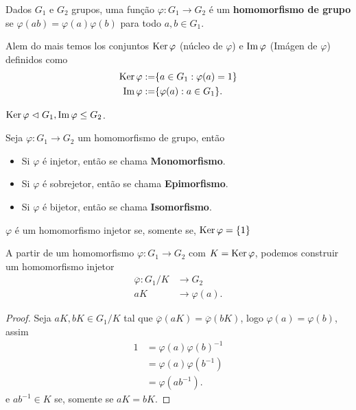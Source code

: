 \begin{definition}
  Dados $G_1$ e $G_2$ grupos, uma função $\varphi:G_1\to G_2$ é um \textbf{homomorfismo de grupo} se $\varphi(ab)=\varphi(a)\varphi(b)$ para todo $a,b\in G_1$.

  Alem do mais temos los conjuntos $\operatorname{Ker} \varphi$ (núcleo de $\varphi$) e $\operatorname{Im}\varphi$ (Imágen de $\varphi$) definidos como
  \begin{align*}
    \operatorname{Ker}\varphi:=&\{a\in G_1:\varphi(a)=1\}\\
    \operatorname{Im}\varphi:=&\{\varphi(a):a\in G_1\}.
  \end{align*}
\end{definition}
\begin{note}
  $\operatorname{Ker}\varphi \vartriangleleft G_1,\operatorname{Im}\varphi\leq G_2$.
\end{note}
\begin{definition}
  Seja $\varphi:G_1\to G_2$ um homomorfismo de grupo, então
  \begin{itemize}
    \item Si $\varphi$ é injetor, então se chama \textbf{Monomorfismo}.
    \item Si $\varphi$ é sobrejetor, então se chama \textbf{Epimorfismo}.
    \item Si $\varphi$ é bijetor, então se chama \textbf{Isomorfismo}. 
  \end{itemize}
\end{definition}
\begin{proposition}
  $\varphi$ é um homomorfismo injetor se, somente se, $\operatorname{Ker}\varphi=\{1\}$ 
\end{proposition}
\begin{proposition}
  A partir de um homomorfismo $\varphi:G_1\to G_2$ com $K=\operatorname{Ker}\varphi$, podemos construir um homomorfismo injetor
  \begin{align*}
    \overline{\varphi}:G_1/K&\to G_2\\
    aK&\to\varphi(a).
  \end{align*}
\end{proposition}
\begin{proof} 
  Seja $aK,bK\in G_1/K$ tal que $\overline{\varphi}(aK)=\overline{\varphi}(bK)$, logo $\varphi(a)=\varphi(b)$, assim
  \begin{align*}
    1&=\varphi(a)\varphi(b)^{-1}\\
    &=\varphi(a)\varphi(b^{-1})\\
    &=\varphi(ab^{-1}).
  \end{align*}
  e $ab^{-1}\in K$ se, somente se $aK=bK$. 
\end{proof}
